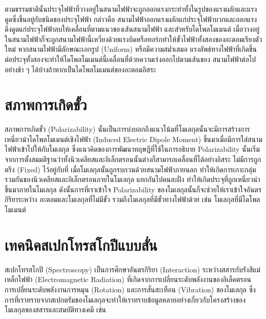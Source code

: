 ตามธรรมชาตินั้นประจุไฟฟ้าที่วางอยู่ในสนามไฟฟ้าจะถูกออกแรงกระทำทั้งในรูปของแรงผลักและแรงดูดซึ่งขึ้นอยู่กับชนิดของประจุไฟฟ้า กล่าวคือ%
สนามไฟฟ้าออกแรงผลักแก่ประจุไฟฟ้าบวกและออกแรงดึงดูดแก่ประจุไฟฟ้าลบให้เคลื่อนที่ตามแนวของเส้นสนามไฟฟ้า และสําหรับไดโพลโมเมนต์%
เมื่อวางอยู่ในสนามไฟฟ้าก็จะถูกสนามไฟฟ้านี้เหวี่ยงด้วยแรงบิดหรือทอร์กทําให้ขั้วไฟฟ้าทั้งสองของอะตอมเรียงตัวใหม่ หากสนามไฟฟ้ามีลักษณะเอกรูป
(Uniform) หรือมีความสม่ำเสมอ แรงลัพธ์ทางไฟฟ้าที่เกิดขึ้นต่อประจุทั้งสองจะทําให้ไดโพลโมเมนต์นี้เคลื่อนที่ด้วยความเร่งออกไปตามเส้นของ%
สนามไฟฟ้าต่อไปอย่างช้า ๆ ได้บ้างถ้าหากเป็นไดโพลโมเมนต์ของอะตอมอิสระ

\section{สภาพการเกิดขั้ว}
\label{sec:polariz}

สภาพการเกิดขั้ว (Polarizability) นั้นเป็นการบ่งบอกถึงแนวโน้มที่โมเลกุลนั้นจะมีการสร้างการเหนี่ยวนำไดโพลโมเมนต์เชิงไฟฟ้า (Induced 
Electric Dipole Moment) ขึ้นมาเมื่อมีการใส่สนามไฟฟ้าเข้าไปให้กับโมเลกุล ซึ่งแนวคิดของการพัฒนาทฤษฎีที่ใช้ในการอธิบาย Polarizability 
นั้นเริ่มจากการตั้งสมมติฐานว่าทั้งนิวเคลียสและอิเล็กตรอนนั้นต่างก็สามารถเคลื่อนที่ได้อย่างอิสระ ไม่มีการถูกตรึง (Fixed) ไว้อยู่กับที่ 
เมื่อโมเลกุลนั้นถูกรบกวนด้วยสนามไฟฟ้าภายนอก ทำให้เกิดการเกาะกลุ่มรวมกันของนิวเคลียสและอิเล็กตรอนภายในโมเลกุล แยกกันไปคนละฝั่ง 
ทำให้เกิดประจุที่ถูกเหนี่ยวนำขึ้นมาภายในโมเลกุล ดังนั้นการที่เราเข้าใจ Polarizability ของโมเลกุลนั้นก็จะช่วยให้เราเข้าใจอันตรกิริยาระหว่าง%
อะตอมและโมเลกุลที่ไม่มีขั้ว รวมถึงโมเลกุลที่มีขั้วทางไฟฟ้าด้วย เช่น โมเลกุลที่มีไดโพลโมเมนต์

\section{เทคนิคสเปกโทรสโกปีแบบสั่น}
\label{sec:spectro}

สเปกโทรสโกปี (Spectroscopy) เป็นการศึกษาอันตรกิริยา (Interaction) ระหว่างสสารกับรังสีแม่เหล็กไฟฟ้า (Electromagnetic Radiation)
ที่เกิดจากการเปลี่ยนระดับพลังงานของอิเล็คตรอน การเปลี่ยนระดับพลังงานการหมุน (Rotation) และการสั่นสะเทือน (Vibration) ของโมเลกุล
ซึ่งการที่เราทราบจากสเปกตรัมของโมเลกุลจะทำให้เราทราบข้อมูลหลายอย่างเกี่ยวกับโครงสร้างของโมเลกุลของสสารและสมบัติทางเคมี เช่น

